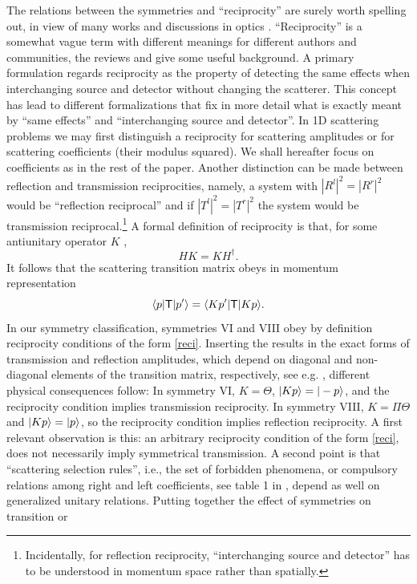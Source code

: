 The relations between the symmetries and ``reciprocity'' are surely worth spelling out, in view of many works and discussions in optics \cite{Lin2011,Feng2011,Fan2012,Peng2014}. ``Reciprocity'' is a somewhat vague term with different meanings for different authors and communities, the reviews \cite{Potton2004} and \cite{Deak2012} give  some useful  background. A primary formulation regards reciprocity as the property of detecting the  same effects when interchanging source and detector without changing the scatterer. This  concept has lead to  different formalizations that fix in more detail what is exactly meant by ``same effects'' and ``interchanging source and detector''.
In 1D scattering problems we may first  distinguish  a reciprocity for scattering amplitudes or for scattering coefficients (their modulus squared). We shall hereafter focus on  coefficients as in the rest of  the paper.
Another distinction can be made between reflection and transmission reciprocities, namely, a system with $|R^l|^2=|R^r|^2$
would be ``reflection reciprocal'' and if $|T^l|^2=|T^r|^2$ the system would be transmission reciprocal.\footnote{Incidentally, for reflection reciprocity, ``interchanging source and detector'' has to be understood in momentum space rather than spatially.}
A formal definition of reciprocity is that, for some antiunitary operator $K$ \cite{Deak2012},
%
\begin{equation}
	\label{reci}
	HK=KH^\dagger.
\end{equation}
%
It follows that the scattering transition  matrix obeys in momentum representation \cite{Deak2012}
%
\begin{equation}\label{tt}
	\la p|{\sf T}|p'\ra=\la Kp'|{\sf T}|Kp\ra.
\end{equation}
%
In our symmetry classification, symmetries VI and VIII obey by definition reciprocity conditions of the form \eqref{reci}.
Inserting the results in the exact forms of transmission and reflection amplitudes, which depend on diagonal and non-diagonal elements of the transition matrix, respectively,   see e.g.  \cite{Muga2004},
different physical consequences follow:  In symmetry VI, $K=\Theta$, $|Kp\rangle=|-p\rangle$, and the reciprocity condition implies transmission reciprocity.
In symmetry VIII, $K=\Pi\Theta$ and $|K p\rangle=|p\rangle$, so the reciprocity condition implies reflection reciprocity.
A first relevant observation is this: an arbitrary reciprocity condition of the form \eqref{reci}, does not necessarily imply symmetrical transmission. A second point is that ``scattering selection rules'',  i.e., the set of forbidden phenomena, or compulsory relations among right and left coefficients, see table 1 in \cite{Ruschhaupt2017}, depend as well on generalized unitary relations. Putting together the effect of symmetries on transition or
